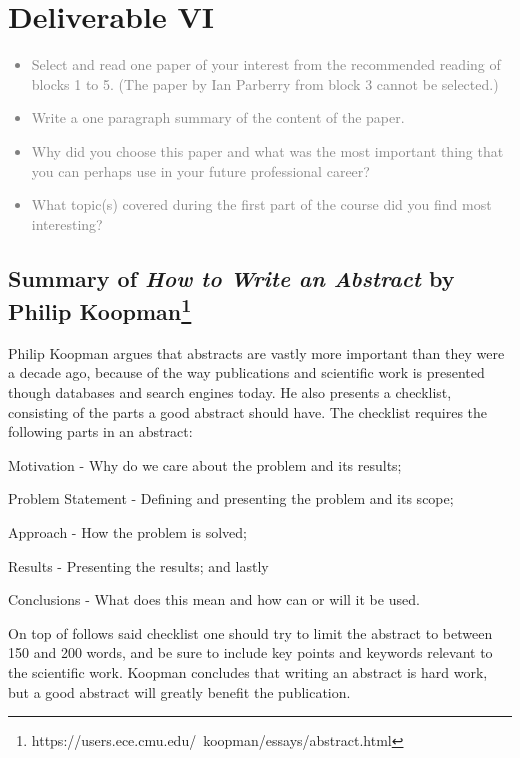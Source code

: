 \chapter{Deliverable VI}
\textcolor{gray}{%
\begin{itemize}
    \item Select and read one paper of your interest from the recommended reading of blocks 1 to 5. (The paper by Ian Parberry from block 3 cannot be selected.)
    \item Write a one paragraph summary of the content of the paper.
    \item Why did you choose this paper and what was the most important thing that you can perhaps use in your future professional career?
    \item What topic(s) covered during the first part of the course did you find most interesting?
\end{itemize}}

\section{Summary of \textit{How to Write an Abstract} by Philip Koopman\footnote{https://users.ece.cmu.edu/~koopman/essays/abstract.html}}
Philip Koopman argues that abstracts are vastly more important than they were a decade ago, because of the way publications and scientific work is presented though databases and search engines today.
He also presents a checklist, consisting of the parts a good abstract should have.
The checklist requires the following parts in an abstract:
\begin{enumerate*}
    \item Motivation - Why do we care about the problem and its results;
    \item Problem Statement - Defining and presenting the problem and its scope;
    \item Approach - How the problem is solved;
    \item Results - Presenting the results; and lastly
    \item Conclusions - What does this mean and how can or will it be used.
\end{enumerate*}
On top of follows said checklist one should try to limit the abstract to between 150 and 200 words, and be sure to include key points and keywords relevant to the scientific work.
Koopman concludes that writing an abstract is hard work, but a good abstract will greatly benefit the publication.

